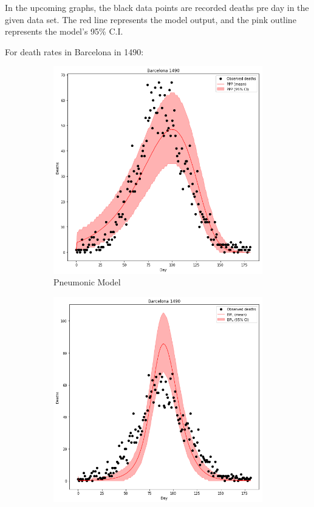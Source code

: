 \documentclass [letterpaper, 12pt] {article}
\begin{document}
In the upcoming graphs, the black data points are recorded deaths pre day in the given data set. The red line represents the model output, and the pink outline represents the model's 95\% C.I. 

\newpage
For death rates in Barcelona in 1490:

\begin{figure}[H]
	\begin{subfigure}{0.48\textwidth}
	\includegraphics[width=\linewidth]{pneum_barcelona.png}
	\caption{Pneumonic Model}
	\end{subfigure}\hspace{\fill}
	\begin{subfigure}{0.48\textwidth}
	\includegraphics[width=\linewidth]{rats1_barcelona.png}

\end{subfigure}
\end{figure}
\end{document}
